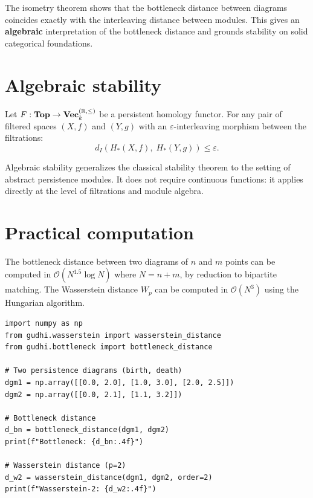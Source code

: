 \begin{intuition}
The isometry theorem shows that the bottleneck distance between
diagrams coincides exactly with the interleaving distance between
modules. This gives an \textbf{algebraic} interpretation of the
bottleneck distance and grounds stability on solid categorical
foundations.
\end{intuition}

\section{Algebraic stability}
\label{sec:algebraic_stability}

\begin{theorem}
Let $F : \mathbf{Top} \to \mathbf{Vec}_k^{(\mathbb{R}, \leq)}$ be a
persistent homology functor. For any pair of filtered spaces
$(X, f)$ and $(Y, g)$ with an $\varepsilon$-interleaving morphism
between the filtrations:
\[
  d_I(H_*(X, f),\; H_*(Y, g)) \leq \varepsilon.
\]
\end{theorem}

\begin{remark}
Algebraic stability generalizes the classical stability theorem to
the setting of abstract persistence modules. It does not require
continuous functions: it applies directly at the level of filtrations
and module algebra.
\end{remark}

\section{Practical computation}
\label{sec:computation}

\begin{proposition}[Complexity]
The bottleneck distance between two diagrams of $n$ and $m$ points
can be computed in $\mathcal{O}(N^{1.5} \log N)$ where $N = n + m$,
by reduction to bipartite matching. The Wasserstein distance $W_p$
can be computed in $\mathcal{O}(N^3)$ using the Hungarian algorithm.
\end{proposition}

\begin{verbatim}
import numpy as np
from gudhi.wasserstein import wasserstein_distance
from gudhi.bottleneck import bottleneck_distance

# Two persistence diagrams (birth, death)
dgm1 = np.array([[0.0, 2.0], [1.0, 3.0], [2.0, 2.5]])
dgm2 = np.array([[0.0, 2.1], [1.1, 3.2]])

# Bottleneck distance
d_bn = bottleneck_distance(dgm1, dgm2)
print(f"Bottleneck: {d_bn:.4f}")

# Wasserstein distance (p=2)
d_w2 = wasserstein_distance(dgm1, dgm2, order=2)
print(f"Wasserstein-2: {d_w2:.4f}")
\end{verbatim}


